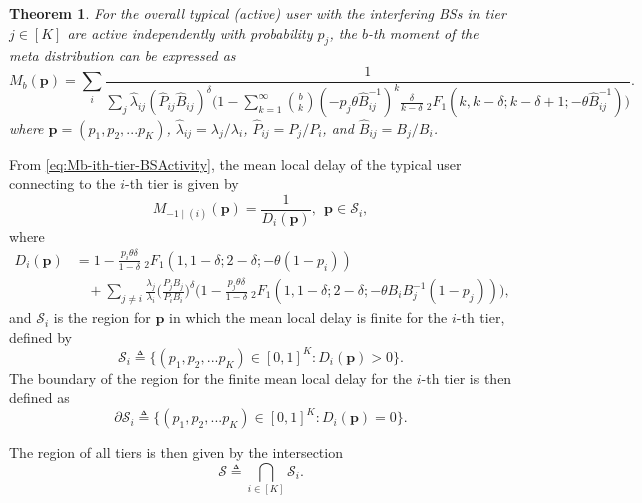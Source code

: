 \documentclass[12pt,draftclsnofoot,journal,onecolumn]{IEEEtran}
\newtheorem{theorem}{Theorem}
\begin{document}
\begin{theorem}
	\label{thm:Mb-typ_BSActivity}
	For the overall typical (active) user with the interfering BSs in tier $j\in[K]$ are active independently with probability $p_j$, the $b$-th moment of the meta distribution can be expressed as
	\begin{equation}\label{eq:Mb-typ-BSActivity}
	M_{b}(\bm p) = \sum\limits_i \frac{1}{\sum\limits_j \hat{\lambda}_{ij}(\hat{P}_{ij}\hat{B}_{ij})^\delta \big(1-\sum\limits_{k=1}^{\infty}\binom bk (-p_j \theta \hat B_{ij}^{-1})^k \frac{\delta}{k-\delta} ~_2F_1(k,k-\delta; k-\delta+1; -\theta \hat B_{ij}^{-1})\big)}.
	\end{equation}
	where $\bm p=(p_1,p_2,...p_K)$, $\hat\lambda_{ij} = \lambda_j/\lambda_i$, $\hat P_{ij} = P_j/P_i$, and $\hat B_{ij} = B_j/B_i$.
\end{theorem} 

From \eqref{eq:Mb-ith-tier-BSActivity}, the mean local delay of the typical user connecting to the $i$-th tier is given by 
\begin{equation}\label{eq:MLDp}
M_{-1\mid(i)}(\bm p) = \frac{1}{D_i(\bm p)},~~{\bm p}\in \mathcal{S}_i,
\end{equation}where 
\begin{align}\label{eq:Di}
D_i(\bm p) &= 1-\frac{p_i\theta\delta}{1-\delta}\:_2F_1(1,1-\delta;2-\delta;-\theta(1-p_i)) \nonumber\\
&~~~~+\sum\limits_{j\neq i}\frac{\lambda_j}{\lambda_i}\Big(\frac{P_jB_j}{P_iB_i}\Big)^\delta\Big(1-\frac{p_j\theta\delta}{1-\delta}\:_2F_1(1,1-\delta;2-\delta;-\theta B_iB_j^{-1}(1-p_j))\Big),
\end{align}
and $\mathcal{S}_i$ is the region for $\bm p$ in which the mean local delay is finite for the $i$-th tier, defined by
\begin{equation}\label{eq:FiniteRegion}
	\mathcal{S}_i\triangleq\{(p_1,p_2,...p_K)\in[0,1]^K:D_i(\bm p)>0\} .
\end{equation} 
The boundary of the region for the finite mean local delay for the $i$-th tier is then defined as
\begin{equation}\label{eq:FiniteBoundary}
 \partial\mathcal{S}_i\triangleq\{(p_1,p_2,...p_K)\in[0,1]^K:D_i(\bm p)=0\} .
\end{equation}

The region of all tiers is then given by the intersection
\begin{equation}\label{eq:FiniteRegionAll}
\mathcal{S}\triangleq\bigcap\limits_{i\in[K]}\mathcal{S}_i.
\end{equation} 
\end{document}
